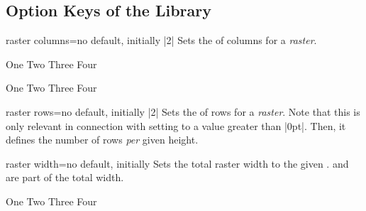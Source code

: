 \clearpage
\subsection{Option Keys of the Library}\label{subsec:raster_options}

\begin{docTcbKey}[][doc new=2014-11-10]{raster columns}{=}{no default, initially |2|}
  Sets the  of columns for a \emph{raster}.
\begin{dispExample}
\begin{tcbitemize}[raster columns=3,
  size=small,colframe=red!50!black,colback=red!10!white]
  \tcbitem One
  \tcbitem Two
  \tcbitem Three
  \tcbitem Four
\end{tcbitemize}
\begin{tcbitemize}[raster columns=4,
  size=small,colframe=blue!50!black,colback=blue!10!white]
  \tcbitem One
  \tcbitem Two
  \tcbitem Three
  \tcbitem Four
\end{tcbitemize}
\end{dispExample}
\end{docTcbKey}

\begin{docTcbKey}[][doc new=2014-11-10]{raster rows}{=}{no default, initially |2|}
  Sets the  of rows for a \emph{raster}.
  Note that this is only relevant in connection with setting 
  to a value greater than |0pt|. Then, it defines the number of rows \emph{per} given
  height.
\end{docTcbKey}


\begin{docTcbKey}[][doc new=2014-11-10]{raster width}{=}{no default, initially }
  Sets the total raster width to the given .
   and  are part
  of the total width.
\begin{dispExample}
\begin{tcbitemize}[raster width=\linewidth/2,
  size=small,colframe=red!50!black,colback=red!10!white]
  \tcbitem One
  \tcbitem Two
  \tcbitem Three
  \tcbitem Four
\end{tcbitemize}
\end{dispExample}
\end{docTcbKey}


